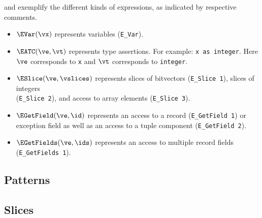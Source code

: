 
 and  exemplify the different kinds of expressions,
as indicated by respective comments.

\begin{itemize}
  \item $\EVar(\vx)$ represents variables (\texttt{E\_Var}).

  \item $\EATC(\ve, \vt)$ represents type assertions. For example: \texttt{x as integer}.
  Here $\ve$ corresponds to \texttt{x} and $\vt$ corresponds to \texttt{integer}.

  \item $\ESlice(\ve, \vslices)$ represents slices of bitvectors (\texttt{E\_Slice 1}),
  slices of integers \\
  (\texttt{E\_Slice 2}),
  and access to array elements (\texttt{E\_Slice 3}).

  \item $\EGetField(\ve, \id)$ represents an access to a record (\texttt{E\_GetField 1})
        or exception field
        as well as an access to a tuple component (\texttt{E\_GetField 2}).

  \item $\EGetFields(\ve, \ids)$ represents an access to multiple record fields (\texttt{E\_GetFields 1}).
\end{itemize}

\subsection{Patterns \label{sec:Patterns}}
\hypertarget{constant-zerobit}{}
\hypertarget{constant-onebit}{}
\hypertarget{constant-xbit}{}

\subsection{Slices \label{sec:Slices}}
\BackupOriginalAST{
\begin{flalign*}
\slice \derives\ & \SliceSingle(\overtext{\expr}{\vi}) &\\
  |\ & \SliceRange(\overtext{\expr}{\vj}, \overtext{\expr}{\vi}) &\\
  |\ & \SliceLength(\overtext{\expr}{\vi}, \overtext{\expr}{\vn}) &\\
  |\ & \SliceStar(\overtext{\expr}{\vi}, \overtext{\expr}{\vn}) &
\end{flalign*}
}

